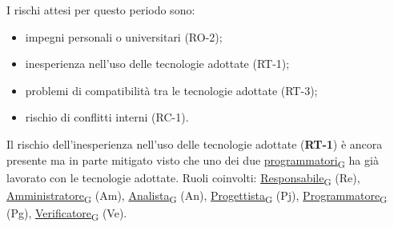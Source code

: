I rischi attesi per questo periodo sono:
\begin{itemize}
	\item impegni personali o universitari (RO-2);
	\item inesperienza nell'uso delle tecnologie adottate (RT-1);
	\item problemi di compatibilità tra le tecnologie adottate (RT-3);
	\item rischio di conflitti interni (RC-1).
\end{itemize}
Il rischio dell'inesperienza nell'uso delle tecnologie adottate (\textbf{RT-1}) è ancora presente ma in parte mitigato visto che uno dei
due \href{https://7last.github.io/docs/pb/documentazione-interna/glossario\#programmatore}{programmatori\textsubscript{G}} ha già lavorato con le tecnologie adottate.
\newpage
{}
Ruoli coinvolti: \href{https://7last.github.io/docs/pb/documentazione-interna/glossario\#responsabile}{Responsabile\textsubscript{G}} (Re), \href{https://7last.github.io/docs/pb/documentazione-interna/glossario\#amministratore}{Amministratore\textsubscript{G}} (Am), \href{https://7last.github.io/docs/pb/documentazione-interna/glossario\#analista}{Analista\textsubscript{G}} (An), \href{https://7last.github.io/docs/pb/documentazione-interna/glossario\#progettista}{Progettista\textsubscript{G}} (Pj), \href{https://7last.github.io/docs/pb/documentazione-interna/glossario\#programmatore}{Programmatore\textsubscript{G}} (Pg), \href{https://7last.github.io/docs/pb/documentazione-interna/glossario\#verificatore}{Verificatore\textsubscript{G}} (Ve).
